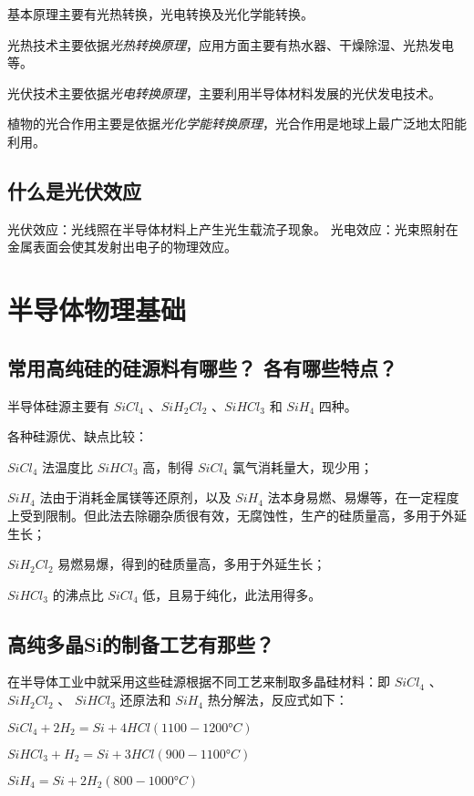 \documentclass{article}
\begin{document}
基本原理主要有光热转换，光电转换及光化学能转换。

光热技术主要依据\emph{光热转换原理}，应用方面主要有热水器、干燥除湿、光热发电等。

光伏技术主要依据\emph{光电转换原理}，主要利用半导体材料发展的光伏发电技术。

植物的光合作用主要是依据\emph{光化学能转换原理}，光合作用是地球上最广泛地太阳能利用。

\subsection{什么是光伏效应}

光伏效应：光线照在半导体材料上产生光生载流子现象。
光电效应：光束照射在金属表面会使其发射出电子的物理效应。

\section{半导体物理基础}

\subsection{常用高纯硅的硅源料有哪些？ 各有哪些特点？}

半导体硅源主要有 $SiCl_4$ 、$SiH_2Cl_2$ 、$SiHCl_3$ 和 $SiH_4$ 四种。

各种硅源优、缺点比较：

$SiCl_4$ 法温度比 $SiHCl_3$ 高，制得 $SiCl_4$ 氯气消耗量大，现少用；

$SiH_4$ 法由于消耗金属镁等还原剂，以及 $SiH_4$ 法本身易燃、易爆等，在一定程度上受到限制。但此法去除硼杂质很有效，无腐蚀性，生产的硅质量高，多用于外延生长；

$SiH_2Cl_2$ 易燃易爆，得到的硅质量高，多用于外延生长；

$SiHCl_3$ 的沸点比 $SiCl_4$ 低，且易于纯化，此法用得多。

\subsection{高纯多晶Si的制备工艺有那些？}

在半导体工业中就采用这些硅源根据不同工艺来制取多晶硅材料：即 $SiCl_4$ 、 $SiH_2Cl_2$  、 $SiHCl_3$ 还原法和 $SiH_4$ 热分解法，反应式如下：

$SiCl_4+ 2H_2 = Si + 4HCl (1100-1200 °C)$

$SiHCl_3 + H_2= Si +3HCl (900-1100 °C)$

$SiH_4 = Si + 2H_2­ (800-1000 °C)$
\end{document}
